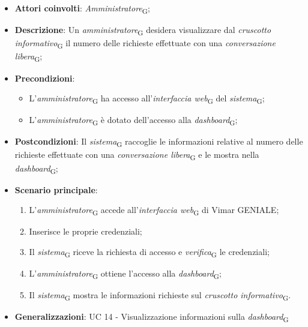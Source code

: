 \begin{itemize}
    \item \textbf{Attori coinvolti}: \textit{Amministratore}\textsubscript{G};
    \item \textbf{Descrizione}: Un \textit{amministratore}\textsubscript{G} desidera visualizzare dal \textit{cruscotto informativo}\textsubscript{G} il numero delle richieste effettuate con una \textit{conversazione libera}\textsubscript{G};
    \item \textbf{Precondizioni}: 
        \begin{itemize}
            \item L’\textit{amministratore}\textsubscript{G} ha accesso all’\textit{interfaccia web}\textsubscript{G} del \textit{sistema}\textsubscript{G};
            \item L’\textit{amministratore}\textsubscript{G} è dotato dell’accesso alla \textit{dashboard}\textsubscript{G};
        \end{itemize}
    \item \textbf{Postcondizioni}: Il \textit{sistema}\textsubscript{G} raccoglie le informazioni relative al numero delle richieste effettuate con una \textit{conversazione libera}\textsubscript{G} e le mostra nella \textit{dashboard}\textsubscript{G};
    \item \textbf{Scenario principale}:
    \begin{enumerate}
    \item L’\textit{amministratore}\textsubscript{G} accede all’\textit{interfaccia web}\textsubscript{G} di Vimar GENIALE;
    \item Inserisce le proprie credenziali;
    \item Il \textit{sistema}\textsubscript{G} riceve la richiesta di accesso e \textit{verifica}\textsubscript{G} le credenziali;
    \item L’\textit{amministratore}\textsubscript{G} ottiene l’accesso alla \textit{dashboard}\textsubscript{G};
    \item Il \textit{sistema}\textsubscript{G} mostra le informazioni richieste sul \textit{cruscotto informativo}\textsubscript{G}.
    \end{enumerate}
    \item \textbf{Generalizzazioni}: UC 14 - Visualizzazione informazioni sulla \textit{dashboard}\textsubscript{G}
\end{itemize}

